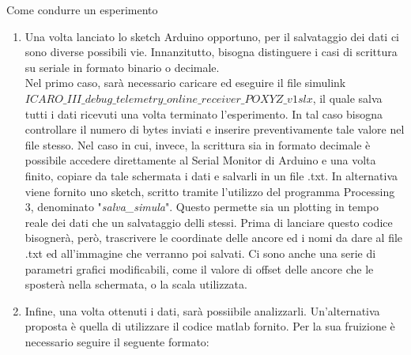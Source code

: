 \documentclass[12pt]{report}
\begin{document}
\begin{section}{Come condurre un esperimento}
\begin{enumerate}
\begin{itemize}
\begin{itemize}
										\item richiesta di informazioni (positioning e ranging) solo al tag con indirizzo I2C 0x4A;
										\item richiesta di informazioni (positioning e ranging) solo al tag con indirizzo I2C 0x4B;
										\item richiesta di informazioni (positioning e ranging)ad entrambi con la successione 0x4A - 0x4B;
										\item  richiesto di informazioni (positioning e ranging)ad entrambi con la successione 0x4B - 0x4A.
									\end{itemize}
									Le operazioni sono ripetute 250 volte per ogni caso.
							\item \textit{sketch\_ranging}:  questo sketch serve nel caso in cui si volesse effettuare un esperimento esclusivamente sul ranging tra un'ancora e i due tag in parallelo.
						 \end{itemize}
				\item Una volta lanciato lo sketch Arduino opportuno, per il salvataggio dei dati ci sono diverse possibili vie. Innanzitutto, bisogna distinguere i casi di scrittura su seriale in formato binario o decimale. \\Nel primo caso, sarà necessario caricare ed eseguire il file simulink 																							\\$ICARO\_III\_debug\_telemetry\_online\_receiver\_POXYZ\_v1slx$, il quale salva tutti i dati ricevuti una volta terminato l'esperimento. In tal caso bisogna controllare il numero di bytes inviati e inserire preventivamente tale valore nel file stesso. Nel caso in cui, invece, la scrittura sia in formato 										decimale è possibile accedere direttamente al Serial Monitor di Arduino e una volta finito, copiare da tale schermata i dati e salvarli in un file .txt. In alternativa viene fornito uno sketch, scritto tramite l'utilizzo del programma Processing 3, denominato "\textit{salva\_simula}". Questo permette sia un 									plotting in tempo reale dei dati che un salvataggio delli stessi. Prima di lanciare questo codice bisognerà, però, trascrivere le coordinate delle ancore ed i nomi da dare al file .txt ed all'immagine che verranno poi salvati. Ci sono anche una serie di parametri grafici modificabili, come il valore di offset 									delle ancore che le sposterà nella schermata, o la scala utilizzata.
				\item Infine, una volta ottenuti i dati, sarà possiibile analizzarli. Un'alternativa proposta è quella di utilizzare il codice matlab fornito. Per la sua fruizione è necessario seguire il seguente formato:

\end{enumerate}
\end{section}
\end{document}
